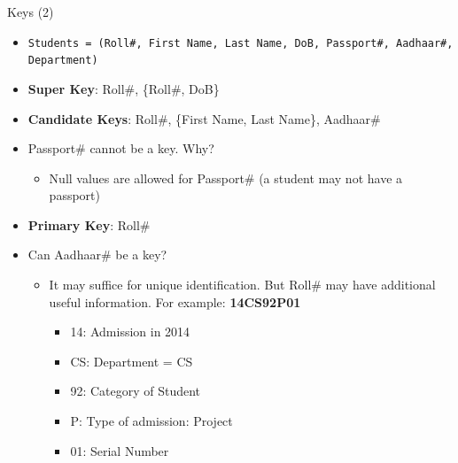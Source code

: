 \documentclass[aspectratio=169, xcolor=dvipsnames]{beamer}
\begin{document}
\begin{frame}{Keys (2)}
    \begin{itemize}
        \item \texttt{Students = (Roll\#, First Name, Last Name, DoB, Passport\#, Aadhaar\#, Department)}
        \item \textbf{Super Key}: Roll\#, \{Roll\#, DoB\}
        \item \textbf{Candidate Keys}: Roll\#, \{First Name, Last Name\}, Aadhaar\#
        \item Passport\# cannot be a key. Why?
        \begin{itemize}
            \item Null values are allowed for Passport\# (a student may not have a passport)
        \end{itemize}
        \item \textbf{Primary Key}: Roll\#
        \item Can Aadhaar\# be a key?
        \begin{itemize}
            \item It may suffice for unique identification. But Roll\# may have additional useful information. For example: \textbf{14CS92P01}
            \begin{itemize}
                \item[$\triangleright$] 14: Admission in 2014
                \item[$\triangleright$] CS: Department = CS
                \item[$\triangleright$] 92: Category of Student
                \item[$\triangleright$] P: Type of admission: Project
                \item[$\triangleright$] 01: Serial Number
            \end{itemize}
        \end{itemize}
    \end{itemize}
\end{frame}
\end{document}
